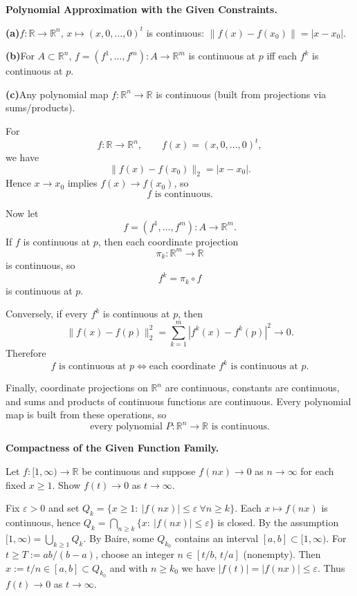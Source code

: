\begin{problem}[CP-II-0517]
\label{prob:cp-ii-0517}
\textbf{Polynomial Approximation with the Given Constraints.}

\renewcommand\labelenumi{(\alph{enumi})}
\par\smallskip\noindent\textbf{(a)}\quad $f:\mathbb{R}\to\mathbb{R}^n$, $x\mapsto (x,0,\dots,0)^t$ is continuous: $\|f(x)-f(x_0)\|=|x-x_0|$.
\par\smallskip\noindent\textbf{(b)}\quad For $A\subset\mathbb{R}^n$, $f=(f^1,\dots,f^m):A\to\mathbb{R}^m$ is continuous at $p$ iff each $f^k$ is continuous at $p$.
\par\smallskip\noindent\textbf{(c)}\quad Any polynomial map $f:\mathbb{R}^n\to\mathbb{R}$ is continuous (built from projections via sums/products).
\end{problem}

\begin{solution}
For
\[
f:\mathbb R\to\mathbb R^n,
\qquad
f(x)=(x,0,\ldots,0)^t,
\]
we have
\[
\|f(x)-f(x_0)\|_2
=
|x-x_0|.
\]
Hence \(x\to x_0\) implies \(f(x)\to f(x_0)\), so
\[
\boxed{f\text{ is continuous}.}
\]

Now let
\[
f=(f^1,\ldots,f^m):A\to\mathbb R^m.
\]
If \(f\) is continuous at \(p\), then each coordinate projection
\[
\pi_k:\mathbb R^m\to\mathbb R
\]
is continuous, so
\[
f^k=\pi_k\circ f
\]
is continuous at \(p\).

Conversely, if every \(f^k\) is continuous at \(p\), then
\[
\|f(x)-f(p)\|_2^2
=
\sum_{k=1}^{m}
|f^k(x)-f^k(p)|^2
\longrightarrow0.
\]
Therefore
\[
\boxed{
f\text{ is continuous at }p
\iff
\text{each coordinate }f^k\text{ is continuous at }p.
}
\]

Finally, coordinate projections on \(\mathbb R^n\) are continuous, constants are continuous,
and sums and products of continuous functions are continuous. Every polynomial map is built
from these operations, so
\[
\boxed{
\text{every polynomial }P:\mathbb R^n\to\mathbb R
\text{ is continuous}.
}
\]
\end{solution}


\begin{problem}[CP-II-0518]
\label{prob:cp-ii-0518}
\textbf{Compactness of the Given Function Family.}

\hspace*{1.5em}Let $f:[1,\infty)\to\mathbb R$ be continuous and suppose $f(n x)\to0$ as $n\to\infty$ for each fixed $x\ge1$.
Show $f(t)\to0$ as $t\to\infty$.

Fix $\varepsilon>0$ and set $Q_k=\{x\ge1:\ |f(n x)|\le\varepsilon\ \forall n\ge k\}$.
Each $x\mapsto f(n x)$ is continuous, hence $Q_k=\bigcap_{n\ge k}\{x:\ |f(n x)|\le\varepsilon\}$ is closed.
By the assumption $[1,\infty)=\bigcup_{k\ge1} Q_k$. By Baire, some $Q_{k_0}$ contains an
interval $[a,b]\subset[1,\infty)$. For $t\ge T:=ab/(b-a)$, choose an integer
$n\in[t/b,\,t/a]$ (nonempty). Then $x:=t/n\in[a,b]\subset Q_{k_0}$ and with $n\ge k_0$
we have $|f(t)|=|f(n x)|\le\varepsilon$. Thus $f(t)\to0$ as $t\to\infty$.

\bigskip
\end{problem}

